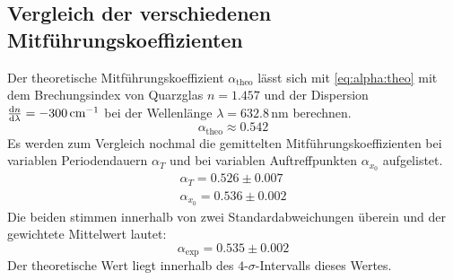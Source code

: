 \subsection{Vergleich der verschiedenen Mitführungskoeffizienten}
Der theoretische Mitführungskoeffizient $\alpha_{\text{theo}}$ lässt sich mit \autoref{eq:alpha:theo} mit dem Brechungsindex von Quarzglas $n=1.457$ 
und der Dispersion $\frac{\mathrm{d} n}{\mathrm{d} \lambda} = -300\,\text{cm}^{-1}$ bei der Wellenlänge  $\lambda = 632.8$\,nm berechnen.
\begin{equation}
  \alpha_{\text{theo}} \approx 0.542
\end{equation}
Es werden zum Vergleich nochmal die gemittelten Mitführungskoeffizienten bei variablen Periodendauern $\alpha_T$ und bei variablen Auftreffpunkten 
$\alpha_{x_0}$ aufgelistet.
\begin{equation}
\begin{split}
  \alpha_T = 0.526 \pm 0.007 \\
  \alpha_{x_0} = 0.536 \pm 0.002
\end{split}
\end{equation}
Die beiden stimmen innerhalb von zwei Standardabweichungen überein und der gewichtete Mittelwert lautet:
\begin{equation}
  \alpha_{\text{exp}} = 0.535 \pm 0.002
\end{equation}
Der theoretische Wert liegt innerhalb des $4$-$\sigma$-Intervalls dieses Wertes.